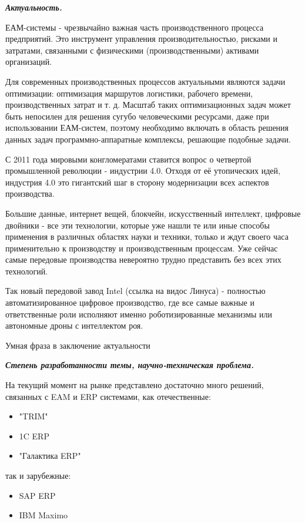 
\textbf{\textit{Актуальность.}}

ЕАМ-системы - чрезвычайно важная часть производственного процесса предприятий. Это инструмент управления производительностью, рисками и затратами, связанными с физическими (производственными) активами организаций.

Для современных производственных процессов актуальными являются задачи
оптимизации: оптимизация маршрутов логистики, рабочего времени, производственных
затрат и т. д. Масштаб таких оптимизационных задач может быть непосилен для решения
сугубо человеческими ресурсами, даже при использовании ЕАМ-систем, поэтому необходимо включать в область решения данных задач программно-аппаратные комплексы, решающие подобные задачи.

С 2011 года мировыми конгломератами ставится вопрос о четвертой промышленной революции - индустрии 4.0. Отходя от её утопических идей, индустрия 4.0 это гигантский шаг в сторону модернизации всех аспектов производства.

Большие данные, интернет вещей, блокчейн, искусственный интеллект, цифровые двойники - все эти технологии, которые уже нашли те или иные способы применения в различных областях науки и техники, только и ждут своего часа применительно к производству и производственным процессам. Уже сейчас самые передовые производства невероятно трудно представить без всех этих технологий.

Так новый передовой завод Intel (ссылка на видос Линуса) - полностью автоматизированное цифровое производство, где все самые важные и ответственные роли исполняют именно роботизированные механизмы или автономные дроны с интеллектом роя.

Умная фраза в заключение актуальности


\textbf{\textit{Степень разработанности темы, научно-техническая проблема.}}

На текущий момент на рынке представлено достаточно много решений, связанных с EAM и ERP системами,  как отечественные:

\begin{itemize}
	\item "TRIM"
	\item 1C ERP
	\item "Галактика ERP"
\end{itemize}

так и зарубежные:

\begin{itemize}
	\item SAP ERP
	\item IBM Maximo
\end{itemize}

